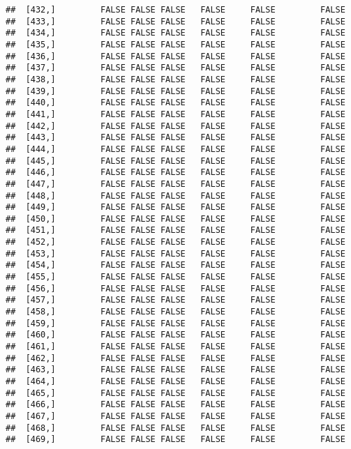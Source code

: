 \documentclass[
]{article}
\begin{document}
\begin{verbatim}
##  [432,]         FALSE FALSE FALSE   FALSE     FALSE         FALSE
##  [433,]         FALSE FALSE FALSE   FALSE     FALSE         FALSE
##  [434,]         FALSE FALSE FALSE   FALSE     FALSE         FALSE
##  [435,]         FALSE FALSE FALSE   FALSE     FALSE         FALSE
##  [436,]         FALSE FALSE FALSE   FALSE     FALSE         FALSE
##  [437,]         FALSE FALSE FALSE   FALSE     FALSE         FALSE
##  [438,]         FALSE FALSE FALSE   FALSE     FALSE         FALSE
##  [439,]         FALSE FALSE FALSE   FALSE     FALSE         FALSE
##  [440,]         FALSE FALSE FALSE   FALSE     FALSE         FALSE
##  [441,]         FALSE FALSE FALSE   FALSE     FALSE         FALSE
##  [442,]         FALSE FALSE FALSE   FALSE     FALSE         FALSE
##  [443,]         FALSE FALSE FALSE   FALSE     FALSE         FALSE
##  [444,]         FALSE FALSE FALSE   FALSE     FALSE         FALSE
##  [445,]         FALSE FALSE FALSE   FALSE     FALSE         FALSE
##  [446,]         FALSE FALSE FALSE   FALSE     FALSE         FALSE
##  [447,]         FALSE FALSE FALSE   FALSE     FALSE         FALSE
##  [448,]         FALSE FALSE FALSE   FALSE     FALSE         FALSE
##  [449,]         FALSE FALSE FALSE   FALSE     FALSE         FALSE
##  [450,]         FALSE FALSE FALSE   FALSE     FALSE         FALSE
##  [451,]         FALSE FALSE FALSE   FALSE     FALSE         FALSE
##  [452,]         FALSE FALSE FALSE   FALSE     FALSE         FALSE
##  [453,]         FALSE FALSE FALSE   FALSE     FALSE         FALSE
##  [454,]         FALSE FALSE FALSE   FALSE     FALSE         FALSE
##  [455,]         FALSE FALSE FALSE   FALSE     FALSE         FALSE
##  [456,]         FALSE FALSE FALSE   FALSE     FALSE         FALSE
##  [457,]         FALSE FALSE FALSE   FALSE     FALSE         FALSE
##  [458,]         FALSE FALSE FALSE   FALSE     FALSE         FALSE
##  [459,]         FALSE FALSE FALSE   FALSE     FALSE         FALSE
##  [460,]         FALSE FALSE FALSE   FALSE     FALSE         FALSE
##  [461,]         FALSE FALSE FALSE   FALSE     FALSE         FALSE
##  [462,]         FALSE FALSE FALSE   FALSE     FALSE         FALSE
##  [463,]         FALSE FALSE FALSE   FALSE     FALSE         FALSE
##  [464,]         FALSE FALSE FALSE   FALSE     FALSE         FALSE
##  [465,]         FALSE FALSE FALSE   FALSE     FALSE         FALSE
##  [466,]         FALSE FALSE FALSE   FALSE     FALSE         FALSE
##  [467,]         FALSE FALSE FALSE   FALSE     FALSE         FALSE
##  [468,]         FALSE FALSE FALSE   FALSE     FALSE         FALSE
##  [469,]         FALSE FALSE FALSE   FALSE     FALSE         FALSE

\end{verbatim}
\end{document}
